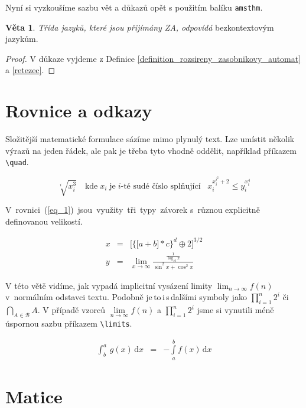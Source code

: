 \documentclass[11pt,a4paper,twocolumn]{article}
\theoremstyle{definition}
\newtheorem{sentence}{Věta}
\begin{document}
\bigskip
\bigskip

    Nyní si vyzkoušíme sazbu vět a důkazů opět s použitím
    balíku \verb|amsthm|.

\begin{sentence}
    \emph{Třída jazyků, které jsou přijímány ZA, odpovídá}
    bezkontextovým jazykům.
\end{sentence}

\begin{proof}
    V důkaze vyjdeme z Definice \ref{definition_rozsireny_zasobnikovy_automat} a \ref{retezec}.
\end{proof}
	
\section{Rovnice a odkazy}

    Složitější matematické formulace sázíme mimo plynulý
    text. Lze umístit několik výrazů na jeden řádek, ale pak je
    třeba tyto vhodně oddělit, například příkazem \verb|\quad|.
    
    $$
        \sqrt[i]{x^3_i} \;\;\;\, \text{kde} \; x_i \; \text{je} \; i\text{-té sudé číslo splňující} \;\;\; x^{x^{i^2}_i+2}_i \leq y^{x^4_i}_i
    $$
    
    V \,rovnici \,(\ref{eq_1}) \,jsou \,využity \,tři \,typy \,závorek s~různou explicitně definovanou velikostí.
    
    \begin{eqnarray}\label{eq_1}
        x & = & \bigg[ \Big\{ \big[ a + b\big] * c \Big\}^d \oplus 2 \bigg]^{3/2} \\
        y & = & \lim_{x\to\infty} \frac{\frac{1}{\log_{10} x}}{\sin^2x + \cos^2x} \nonumber
    \end{eqnarray}
    
    V této větě vidíme, jak vypadá implicitní vysázení limity $ \lim_{n\to\infty} f(n) $ v~normálním odstavci textu. Podobně je\,to\,i\,s\,dalšími symboly jako $ \prod^n_{i=1} 2^i$ či $\bigcap_{A \in \mathcal{B}} A$. V případě vzorců $ \lim\limits_{n\to\infty} f(n) $ a ${\prod\limits_{i=1}^{n} 2^i}$ jsme si vynutili méně úspornou sazbu příkazem \verb|\limits|.
    
    \begin{eqnarray}
      \int^a_b \, g(x) \, \mathrm{d}x & = & - \int\limits^b_a f(x) \, \mathrm{d}x
    \end{eqnarray}
    
\section{Matice}
\end{document}
